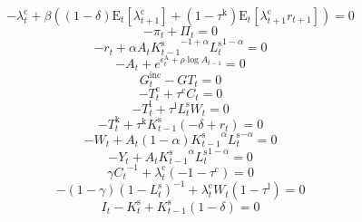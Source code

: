 \begin{equation}
-\lambda^{\mathrm{c}}_{t} + {\beta} \left(\left(1 - \delta\right) {\mathrm{E}_{t}\left[\lambda^{\mathrm{c}}_{t+1}\right]} + \left(1 - \tau^{\mathrm{k}}\right) {\mathrm{E}_{t}\left[{\lambda^{\mathrm{c}}_{t+1}} {r_{t+1}}\right]}\right) = 0
\end{equation}
\begin{equation}
-\pi_{t} + \Pi_{t} = 0
\end{equation}
\begin{equation}
-r_{t} + {\alpha} {A_{t}} {{K^{\mathrm{s}}_{t-1}}^{-1 + \alpha}} {{L^{\mathrm{s}}_{t}}^{1 - \alpha}} = 0
\end{equation}
\begin{equation}
-A_{t} + e^{\epsilon^{\mathrm{A}}_{t} + {\rho} {\log{A_{t-1}}}} = 0
\end{equation}
\begin{equation}
G^{\mathrm{inc}}_{t} - {G\!T}_{t} = 0
\end{equation}
\begin{equation}
-T^{\mathrm{c}}_{t} + {\tau^{\mathrm{c}}} {C_{t}} = 0
\end{equation}
\begin{equation}
-T^{\mathrm{l}}_{t} + {\tau^{\mathrm{l}}} {L^{\mathrm{s}}_{t}} {W_{t}} = 0
\end{equation}
\begin{equation}
-T^{\mathrm{k}}_{t} + {\tau^{\mathrm{k}}} {K^{\mathrm{s}}_{t-1}} \left(-\delta + r_{t}\right) = 0
\end{equation}
\begin{equation}
-W_{t} + {A_{t}} \left(1 - \alpha\right) {{K^{\mathrm{s}}_{t-1}}^{\alpha}} {{L^{\mathrm{s}}_{t}}^{-\alpha}} = 0
\end{equation}
\begin{equation}
-Y_{t} + {A_{t}} {{K^{\mathrm{s}}_{t-1}}^{\alpha}} {{L^{\mathrm{s}}_{t}}^{1 - \alpha}} = 0
\end{equation}
\begin{equation}
{\gamma} {C_{t}}^{-1} + {\lambda^{\mathrm{c}}_{t}} \left(-1 - \tau^{\mathrm{c}}\right) = 0
\end{equation}
\begin{equation}
-\left(1 - \gamma\right) \left(1 - L^{\mathrm{s}}_{t}\right)^{-1} + {\lambda^{\mathrm{c}}_{t}} {W_{t}} \left(1 - \tau^{\mathrm{l}}\right) = 0
\end{equation}
\begin{equation}
I_{t} - K^{\mathrm{s}}_{t} + {K^{\mathrm{s}}_{t-1}} \left(1 - \delta\right) = 0
\end{equation}
